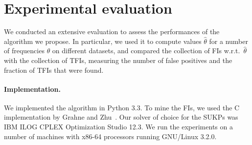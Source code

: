 \section{Experimental evaluation}\label{sec:experiments}
We conducted an extensive evaluation to assess the performances of the algorithm
we propose. In particular, we used it %
to compute values $\hat\theta$
for a number of frequencies $\theta$ on different datasets, and compared the
collection of FIs w.r.t.~$\hat\theta$ with the collection of TFIs, measuring
the number of false positives %
and the fraction of TFIs that were found.



\paragraph*{Implementation.}
We implemented the algorithm in Python 3.3. %
To mine the FIs, we used the C implementation by Grahne
and Zhu~\citep{GrahneZ03}. %
Our solver of choice for the SUKPs was IBM\textsuperscript{\textregistered}
ILOG\textsuperscript{\textregistered} CPLEX\textsuperscript{\textregistered}
Optimization Studio 12.3. %
We run the experiments on a number of machines with x86-64 processors running
GNU/Linux 3.2.0.

